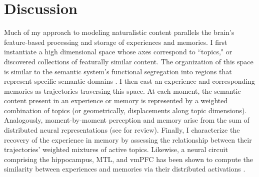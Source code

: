 \documentclass{article}
\begin{document}
\section*{Discussion}
Much of my approach to modeling naturalistic content parallels the brain's feature-based processing and storage of experiences and memories.  I first instantiate a high dimensional space whose axes correspond to ``topics," or discovered collections of featurally similar content.  The organization of this space is similar to the semantic system's functional segregation into regions that represent specific semantic domains \citep{Warr75, DamaEtal96, CaraShel98, MummEtal98, MitcEtal08a, JustEtal10, HuthEtal12, HuthEtal16}.  I then cast an experience and corresponding memories as trajectories traversing this space.  At each moment, the semantic content present in an experience or memory is represented by a weighted combination of topics (or geometrically, displacements along topic dimensions).  Analogously, moment-by-moment perception and memory arise from the sum of distributed neural representations (see \citealp{RaoHowa08, RissWagn12} for review).  Finally, I characterize the recovery of the experience in memory by assessing the relationship between their trajectories'  weighted mixtures of active topics.  Likewise, a neural circuit comprising the hippocampus, MTL, and vmPFC has been shown to compute the similarity between experiences and memories via their distributed activations \citep{RangEtal04b, Dava06, WiltSilv07, RichEtal14, SweeEtal14}.
\end{document}
